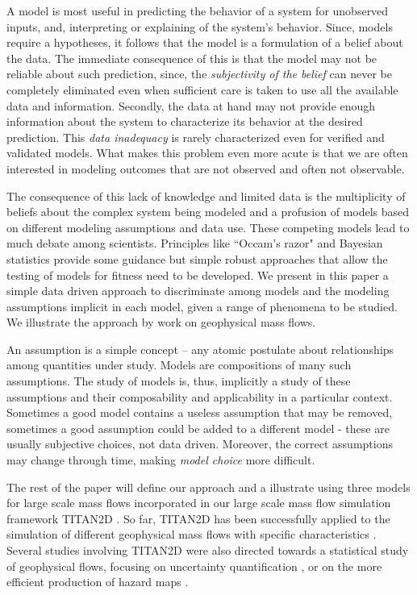\documentclass{article}
\begin{document}
A model is most useful in predicting the behavior of a system for unobserved inputs, and, interpreting or explaining of the system's behavior. Since, models require a hypotheses, it follows  that the model is a formulation of a belief about the data. The immediate consequence of this is that the model may not be reliable about such prediction, since, the {\it subjectivity of the belief} can never be completely eliminated \citep{Kennedy2001, Higdon2004} even when sufficient care is taken to use all the available data and information. Secondly, the data at hand may not provide enough information about the system to characterize its behavior at the desired prediction. This {\it data inadequacy} is rarely characterized even for verified and validated models. What makes this problem even more acute is that we are often interested in modeling outcomes that are not observed and often not observable.

The consequence of this lack of knowledge and limited data is the multiplicity of beliefs about the complex system being modeled and a profusion of models based on different modeling assumptions and data use. These competing models lead to much debate among scientists. Principles like ``Occam's razor" and Bayesian statistics \citep{Farrell2015} provide some guidance but simple robust approaches that allow the testing of models for fitness need to be developed. We present in this paper a simple data driven approach to discriminate among models and the modeling assumptions implicit in each model, given a range of phenomena to be studied. We illustrate the approach by work on geophysical mass flows.


An assumption is a simple concept -- any atomic postulate about relationships among quantities under study. Models are compositions of many such assumptions. The study of models is, thus, implicitly a study of these assumptions and their composability and applicability in a particular context. Sometimes a good model contains a useless assumption that may be removed, sometimes a good assumption could be added to a different model - these are usually subjective choices, not data driven. Moreover, the correct assumptions may change through time, making {\em model choice} more difficult.

The rest of the paper will define our approach and a illustrate using three models for large scale mass flows incorporated in our large scale mass flow simulation framework  TITAN2D \citep{Patra2005,Patra2006, Yu2009, Aghakhani2016}.
So far, TITAN2D has been successfully applied to the simulation of different geophysical mass flows with specific characteristics \citep{Sheridan2005, Rupp2006, Norini2008, Charbonnier2009, Procter2010, Sheridan2010, Sulpizio2010, Capra2011}. Several studies involving TITAN2D were also directed towards a statistical study of geophysical flows, focusing on uncertainty quantification \citep{Dalbey2008, Dalbey2009, Stefanescu2012b, Stefanescu2012a}, or on the more efficient production of hazard maps \citep{Bayarri2009, Spiller2014, Bayarri2015, Ogburn2016}.
\end{document}
